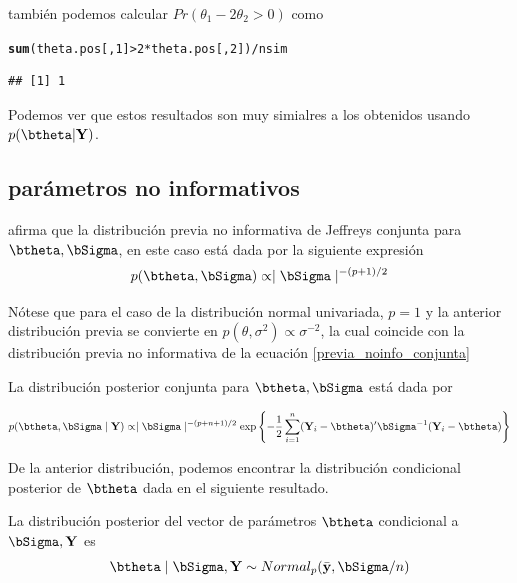 \documentclass[10pt,openright]{book}\usepackage[]{graphicx}\usepackage[]{color}
\makeatletter
\newcommand{\hlnum}[1]{\textcolor[rgb]{0.686,0.059,0.569}{#1}}%
\newcommand{\hlopt}[1]{\textcolor[rgb]{0,0,0}{#1}}%
\newcommand{\hlstd}[1]{\textcolor[rgb]{0.345,0.345,0.345}{#1}}%
\newcommand{\hlkwd}[1]{\textcolor[rgb]{0.737,0.353,0.396}{\textbf{#1}}}%
\newenvironment{kframe}{%
 \def\at@end@of@kframe{}%
 \ifinner\ifhmode%
  \def\at@end@of@kframe{\end{minipage}}%
  \begin{minipage}{\columnwidth}%
 \fi\fi%
 \def\FrameCommand##1{\hskip\@totalleftmargin \hskip-\fboxsep
 \colorbox{shadecolor}{##1}\hskip-\fboxsep
     \hskip-\linewidth \hskip-\@totalleftmargin \hskip\columnwidth}%
 \MakeFramed {\advance\hsize-\width
   \@totalleftmargin\z@ \linewidth\hsize
   \@setminipage}}%
 {\par\unskip\endMakeFramed%
 \at@end@of@kframe}
\newenvironment{knitrout}{}{} %
\makeatother
\begin{document}
\begin{Eje}
\begin{knitrout}
\begin{kframe}
\begin{verbatim}
\end{verbatim}
\end{kframe}
\end{knitrout}
tambi\'en podemos calcular $Pr(\theta_1-2\theta_2>0)$ como 
\begin{knitrout}
\color{fgcolor}\begin{kframe}
\begin{alltt}
\hlkwd{sum}\hlstd{(theta.pos[,}\hlnum{1}\hlstd{]} \hlopt{>} \hlnum{2}\hlopt{*}\hlstd{theta.pos[,}\hlnum{2}\hlstd{])}\hlopt{/}\hlstd{nsim}
\end{alltt}
\begin{verbatim}
## [1] 1
\end{verbatim}
\end{kframe}
\end{knitrout}
Podemos ver que estos resultados son muy simialres a los obtenidos usando $p(\btheta|\mathbf{Y})$.
\end{Eje}


\subsection{par\'ametros no informativos}

 afirma que la distribuci\'on previa no informativa de Jeffreys conjunta para $\btheta,\bSigma$, en este caso est\'a dada por la siguiente expresi\'on
\begin{equation*}
p(\btheta,\bSigma)\propto \mid \bSigma \mid ^{-(p+1)/2}
\end{equation*}

N\'otese que para el caso de la distribuci\'on normal univariada, $p=1$ y la anterior distribuci\'on previa se convierte en $p(\theta,\sigma^2)\propto \sigma^{-2}$, la cual coincide con la distribuci\'on previa no informativa de la ecuaci\'on \ref{previa_noinfo_conjunta} 

La distribuci\'on posterior conjunta para $\btheta,\bSigma$ est\'a dada por

\begin{equation*}
p(\btheta,\bSigma \mid \mathbf{Y})\propto
\mid \bSigma \mid ^{-(p+n+1)/2}
\exp\left\{ -\frac{1}{2}\sum_{i=1}^n
  (\mathbf{Y}_i-\btheta)'\bSigma^{-1}(\mathbf{Y}_i-\btheta)\right\}
  \end{equation*}

De la anterior distribuci\'on, podemos encontrar la distribuci\'on condicional posterior de $\btheta$ dada en el siguiente resultado.
\begin{Res}
La distribuci\'on posterior del vector de par\'ametros $\btheta$ condicional a $\bSigma,\mathbf{Y}$ es
\begin{equation*}
\btheta \mid \bSigma,\mathbf{Y}\sim Normal_p(\bar{\mathbf{y}},\bSigma/n)
\end{equation*}
\end{Res}
\end{document}

